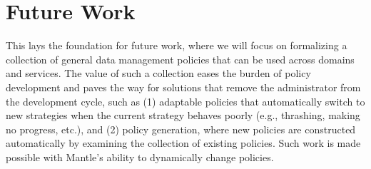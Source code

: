 \section{Future Work}

This lays the foundation for future work, where we will focus on formalizing a
collection of general data management policies that can be used across domains
and services. The value of such a collection eases the burden of policy
development and paves the way for solutions that remove the administrator from
the development cycle, such as (1) adaptable policies that automatically switch
to new strategies when the current strategy behaves poorly ({e.g.}, thrashing,
making no progress, etc.), and (2) policy generation, where new policies are
constructed automatically by examining the collection of existing policies.
Such work is made possible with Mantle's ability to dynamically change
policies.

